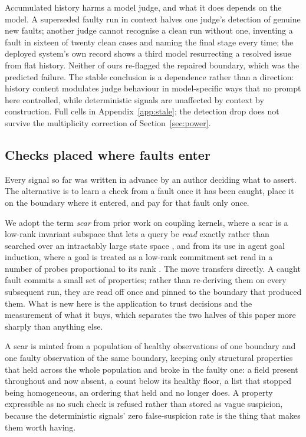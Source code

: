 Accumulated history harms a model judge, and what it does depends on the model. A
superseded faulty run in context halves one judge's detection of genuine new faults;
another judge cannot recognise a clean run without one, inventing a fault in sixteen of
twenty clean cases and naming the final stage every time; the deployed system's own record
shows a third model resurrecting a resolved issue from flat history. Neither of ours
re-flagged the repaired boundary, which was the predicted failure. The stable conclusion
is a dependence rather than a direction: history content modulates judge behaviour in
model-specific ways that no prompt here controlled, while deterministic signals are
unaffected by context by construction. Full cells in Appendix~\ref{app:stale}; the
detection drop does not survive the multiplicity correction of Section~\ref{sec:power}.

\subsection{Checks placed where faults enter}
\label{sec:scars}

Every signal so far was written in advance by an author deciding what to assert. The
alternative is to learn a check from a fault once it has been caught, place it on the
boundary where it entered, and pay for that fault only once.

We adopt the term \emph{scar} from prior work on coupling kernels, where a scar is a
low-rank invariant subspace that lets a query be \emph{read} exactly rather than searched
over an intractably large state space \cite{rovai2026worldkernel}, and from its use in
agent goal induction, where a goal is treated as a low-rank commitment set read in a
number of probes proportional to its rank \cite{rovai2026civex}. The move transfers
directly. A caught fault commits a small set of properties; rather than re-deriving them
on every subsequent run, they are read off once and pinned to the boundary that produced
them. What is new here is the application to trust decisions and the measurement of what
it buys, which separates the two halves of this paper more sharply than anything else.

A scar is minted from a population of healthy observations of one boundary and one faulty
observation of the same boundary, keeping only structural properties that held across the
whole population and broke in the faulty one: a field present throughout and now absent, a
count below its healthy floor, a list that stopped being homogeneous, an ordering that
held and no longer does. A property expressible as no such check is refused rather than
stored as vague suspicion, because the deterministic signals' zero false-suspicion rate is
the thing that makes them worth having.

